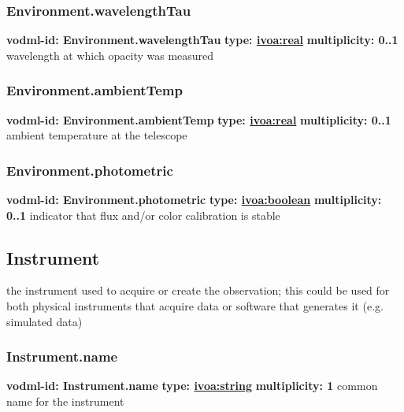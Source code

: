     \subsubsection{Environment.wavelengthTau}
      \textbf{vodml-id: Environment.wavelengthTau} \newline
      \textbf{type: \hyperref[sect:ivoa]{ivoa:real}} \newline
      \textbf{multiplicity: 0..1} \newline
      wavelength at which opacity was measured

    \subsubsection{Environment.ambientTemp}
      \textbf{vodml-id: Environment.ambientTemp} \newline
      \textbf{type: \hyperref[sect:ivoa]{ivoa:real}} \newline
      \textbf{multiplicity: 0..1} \newline
      ambient temperature at the telescope

    \subsubsection{Environment.photometric}
      \textbf{vodml-id: Environment.photometric} \newline
      \textbf{type: \hyperref[sect:ivoa]{ivoa:boolean}} \newline
      \textbf{multiplicity: 0..1} \newline
      indicator that flux and/or color calibration is stable

  \subsection{Instrument}
  \label{sect:Instrument}
    the instrument used to acquire or create the observation; this could be used for both physical instruments that acquire data or software that generates it (e.g. simulated data)

    \subsubsection{Instrument.name}
      \textbf{vodml-id: Instrument.name} \newline
      \textbf{type: \hyperref[sect:ivoa]{ivoa:string}} \newline
      \textbf{multiplicity: 1} \newline
      common name for the instrument

